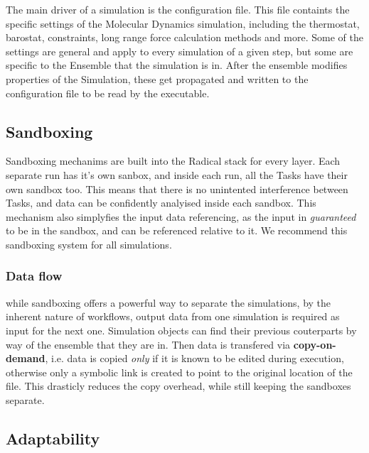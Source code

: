 The main driver of a simulation is the configuration file. This file
containts the specific settings of the Molecular Dynamics simulation,
including the thermostat, barostat, constraints, long range force calculation
methods and more. Some of the settings are general and apply to every
simulation of a given step, but some are specific to the Ensemble that the
simulation is in. After the ensemble modifies properties of the Simulation,
these get propagated and written to the configuration file to be read by the
executable.

\subsection{Sandboxing}

Sandboxing mechanims are built into the Radical stack for every layer. Each
separate run has it's own sanbox, and inside each run, all the Tasks have
their own sandbox too. This means that there is no unintented interference
between Tasks, and data can be confidently analyised inside each sandbox.
This mechanism also simplyfies the input data referencing, as the input in
\emph{guaranteed} to be in the sandbox, and can be referenced relative to it.
We recommend this sandboxing system for all simulations.

\subsubsection{Data flow}

while sandboxing offers a powerful way to separate the simulations, by the
inherent nature of workflows, output data from one simulation is required as
input for the next one. Simulation objects can find their previous
couterparts by way of the ensemble that they are in. Then data is transfered
via \textbf{copy-on-demand}, i.e. data is copied \emph{only} if it is known
to be edited during execution, otherwise only a symbolic link is created to
point to the original location of the file. This drasticly reduces the copy
overhead, while still keeping the sandboxes separate.

\subsection{Adaptability}

